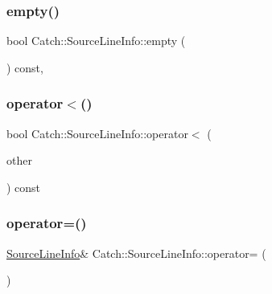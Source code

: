 \subsubsection{\texorpdfstring{empty()}{empty()}}
{\footnotesize\ttfamily bool Catch\+::\+Source\+Line\+Info\+::empty (\begin{DoxyParamCaption}{ }\end{DoxyParamCaption}) const\hspace{0.3cm}{\ttfamily [inline]}, {\ttfamily [noexcept]}}

\mbox{\label{struct_catch_1_1_source_line_info_af77415416919d2d6030b4be085b92f7a}} 
\subsubsection{\texorpdfstring{operator$<$()}{operator<()}}
{\footnotesize\ttfamily bool Catch\+::\+Source\+Line\+Info\+::operator$<$ (\begin{DoxyParamCaption}\item[{\mbox{\hyperlink{struct_catch_1_1_source_line_info}{Source\+Line\+Info}} const \&}]{other }\end{DoxyParamCaption}) const\hspace{0.3cm}{\ttfamily [noexcept]}}

\mbox{\label{struct_catch_1_1_source_line_info_a1a6cfc0197357ef4e329bb256aa8a354}} 
\subsubsection{\texorpdfstring{operator=()}{operator=()}\hspace{0.1cm}{\footnotesize\ttfamily [1/2]}}
{\footnotesize\ttfamily \mbox{\hyperlink{struct_catch_1_1_source_line_info}{Source\+Line\+Info}}\& Catch\+::\+Source\+Line\+Info\+::operator= (\begin{DoxyParamCaption}\item[{\mbox{\hyperlink{struct_catch_1_1_source_line_info}{Source\+Line\+Info}} const \&}]{ }\end{DoxyParamCaption})\hspace{0.3cm}{\ttfamily [default]}}

